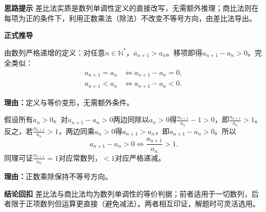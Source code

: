 \begin{proofbox}
	\textbf{\textcolor{CProof}{思路提示}}
	差比法实质是数列单调性定义的直接改写，无需额外推理；商比法则在每项为正的条件下，利用正数乘法（除法）不改变不等号方向，由差比法导出。

	\medskip
	\textbf{\textcolor{CProof}{正式推导}}
	\begin{description}[style=nextline, leftmargin=2.8em, labelsep=0.5em, itemsep=0.55em]
		\item[\textbf{步骤一（差判三情形）：}]
			由数列严格递增的定义：对任意$n\in\mathbb{N}^*$，$a_{n+1}>a_n$。移项即得$a_{n+1}-a_n>0$。完全类似：
			\[
				\begin{aligned}
					a_{n+1}=a_n&\iff a_{n+1}-a_n=0,\\ a_{n+1}<a_n&\iff a_{n+1}-a_n<0.
			\end{aligned}
			\]
			\par\textbf{理由：}定义与等价变形，无需额外条件。
		\item[\textbf{步骤二（商判推导）：}]
			假设所有$a_n>0$。对$a_{n+1}-a_n>0$两边同除以$a_n>0$得$\frac{a_{n+1}}{a_n}-1>0$，即$\frac{a_{n+1}}{a_n}>1$。反之，若$\frac{a_{n+1}}{a_n}>1$，两边同乘$a_n>0$得$a_{n+1}>a_n$，即$a_{n+1}-a_n>0$。所以
			\[
				a_{n+1}-a_n>0\iff\frac{a_{n+1}}{a_n}>1.
			\]
			同理可证$\frac{a_{n+1}}{a_n}=1$对应常数列，$<1$对应严格递减。
			\par\textbf{理由：}正数乘除保持不等号方向。
	\end{description}

	\medskip
	\textbf{\textcolor{CProof}{结论回扣}}
	差比法与商比法均为数列单调性的等价判据；前者适用于一切数列，后者限于正项数列但运算更直接（避免减法）。两者相互印证，解题时可灵活选用。
\end{proofbox}
